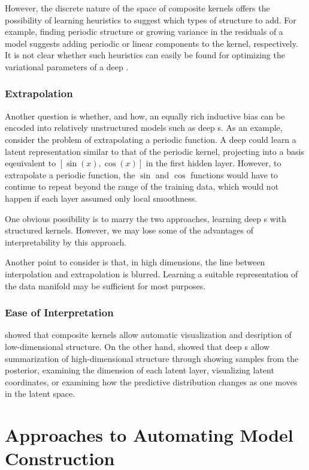 However, the discrete nature of the space of composite kernels offers the possibility of learning heuristics to suggest which types of structure to add.
For example, finding periodic structure or growing variance in the residuals of a model suggests adding periodic or linear components to the kernel, respectively.
It is not clear whether such heuristics can easily be found for optimizing the variational parameters of a deep \gp{}.

\subsubsection{Extrapolation}
Another question is whether, and how, an equally rich inductive bias can be encoded into relatively unstructured models such as deep \gp{}s.
As an example, consider the problem of extrapolating a periodic function.
A deep \gp{} could learn a latent representation similar to that of the periodic kernel, projecting into a basis eqeuivalent to $[\sin(x), \cos(x)]$ in the first hidden layer.
However, to extrapolate a periodic function, the $\sin$ and $\cos$ functions would have to continue to repeat beyond the range of the training data, which would not happen if each layer assumed only local smoothness.

One obvious possibility is to marry the two approaches, learning deep \gp{}s with structured kernels.
However, we may lose some of the advantages of interpretability by this approach.

Another point to consider is that, in high dimensions, the line between interpolation and extrapolation is blurred.
Learning a suitable representation of the data manifold may be sufficient for most purposes.

\subsubsection{Ease of Interpretation}
 showed that composite kernels allow automatic visualization and desription of low-dimensional structure.
On the other hand, \citet{damianou2012deep} showed that deep \gplvm{}s allow summarization of high-dimensional structure through showing samples from the posterior, examining the dimension of each latent layer, visualizing latent coordinates, or examining how the predictive distribution changes as one moves in the latent space.




\section{Approaches to Automating Model Construction}

